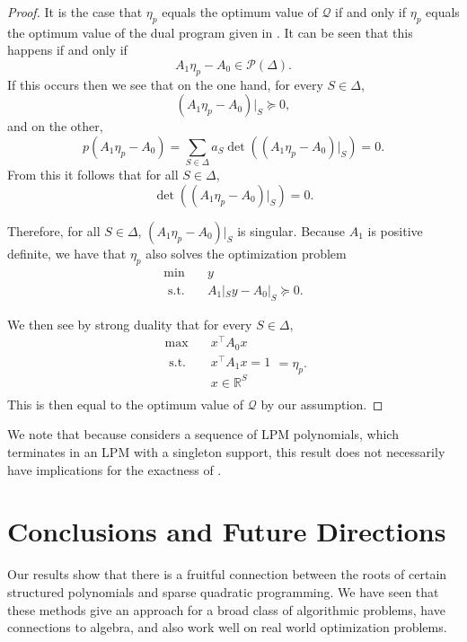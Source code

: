 \documentclass{amsart}
\theoremstyle{definition}
\newcommand{\R}{\mathbb{R}}
\newcommand{\st}{{\text{ s.t. }}}
\begin{document}
\begin{proof}
    It is the case that $\eta_p$ equals the optimum value of $\mathcal{Q}$ if and only if $\eta_p$ equals the optimum value of the dual program given in .
    It can be seen that this happens if and only if
    \[
        A_1 \eta_p - A_0 \in \mathcal{P}(\Delta).
    \]
    If this occurs then we see that on the one hand, for every $S \in \Delta$,
    \[
        (A_1 \eta_p - A_0)|_S \succeq 0,
    \]
    and on the other,
    \[
        p(A_1 \eta_p - A_0) = \sum_{S \in \Delta} a_S\det((A_1 \eta_p - A_0)|_S) = 0.
    \]
    From this it follows that for all $S \in \Delta$,
    \[
        \det((A_1 \eta_p - A_0)|_S) = 0.
    \]

    Therefore, for all $S \in \Delta$, $(A_1 \eta_p - A_0)|_S$ is singular. Because $A_1$ is positive definite, we have that $\eta_p$ also solves the optimization problem
    \begin{equation}
        \begin{aligned}
            \min\quad & y\\
            \st & A_1|_Sy - A_0|_S \succeq 0.
        \end{aligned}
    \end{equation}

    We then see by strong duality that for every $S \in \Delta$,
    \begin{equation}
    \begin{aligned}
        \max\quad & x^{\intercal}A_0x\\
        \st & x^{\intercal}A_1x = 1\\
            & x \in \R^S\\
    \end{aligned}
    = \eta_p.
    \end{equation}
    This is then equal to the optimum value of $\mathcal{Q}$ by our assumption.
\end{proof}
We note that because  considers a sequence of LPM polynomials, which terminates in an LPM with a singleton support, this result does not necessarily have implications for the exactness of .

\section{Conclusions and Future Directions}
Our results show that there is a fruitful connection between the roots of certain structured polynomials and sparse quadratic programming.
We have seen that these methods give an approach for a broad class of algorithmic problems, have connections to algebra, and also work well on real world optimization problems.
\end{document}
